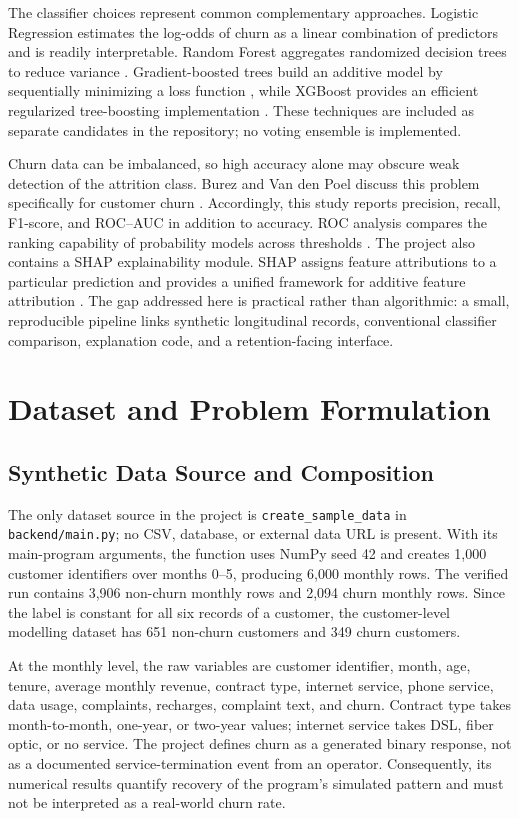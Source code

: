 \documentclass[conference]{IEEEtran}
\begin{document}
The classifier choices represent common complementary approaches. Logistic Regression estimates the log-odds of churn as a linear combination of predictors and is readily interpretable. Random Forest aggregates randomized decision trees to reduce variance \cite{breiman}. Gradient-boosted trees build an additive model by sequentially minimizing a loss function \cite{friedman}, while XGBoost provides an efficient regularized tree-boosting implementation \cite{chen}. These techniques are included as separate candidates in the repository; no voting ensemble is implemented.

Churn data can be imbalanced, so high accuracy alone may obscure weak detection of the attrition class. Burez and Van den Poel discuss this problem specifically for customer churn \cite{burez}. Accordingly, this study reports precision, recall, F1-score, and ROC--AUC in addition to accuracy. ROC analysis compares the ranking capability of probability models across thresholds \cite{fawcett}. The project also contains a SHAP explainability module. SHAP assigns feature attributions to a particular prediction and provides a unified framework for additive feature attribution \cite{lundberg}. The gap addressed here is practical rather than algorithmic: a small, reproducible pipeline links synthetic longitudinal records, conventional classifier comparison, explanation code, and a retention-facing interface.

\section{Dataset and Problem Formulation}
\subsection{Synthetic Data Source and Composition}
The only dataset source in the project is \texttt{create\_sample\_data} in \texttt{backend/main.py}; no CSV, database, or external data URL is present. With its main-program arguments, the function uses NumPy seed 42 and creates 1,000 customer identifiers over months 0--5, producing 6,000 monthly rows. The verified run contains 3,906 non-churn monthly rows and 2,094 churn monthly rows. Since the label is constant for all six records of a customer, the customer-level modelling dataset has 651 non-churn customers and 349 churn customers.

At the monthly level, the raw variables are customer identifier, month, age, tenure, average monthly revenue, contract type, internet service, phone service, data usage, complaints, recharges, complaint text, and churn. Contract type takes month-to-month, one-year, or two-year values; internet service takes DSL, fiber optic, or no service. The project defines churn as a generated binary response, not as a documented service-termination event from an operator. Consequently, its numerical results quantify recovery of the program's simulated pattern and must not be interpreted as a real-world churn rate.
\end{document}

